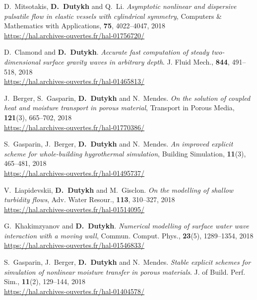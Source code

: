 \documentclass[final, a4paper, oneside, 12pt]{article}
\numberwithin{equation}{section}
\begin{document}
\begin{etaremune}
  \item D.~Mitsotakis, \textbf{D.~Dutykh} and Q.~Li. \textit{Asymptotic nonlinear and dispersive pulsatile flow in elastic vessels with cylindrical symmetry}, Computers \& Mathematics with Applications, \textbf{75}, 4022--4047, 2018 \\ %
  \url{https://hal.archives-ouvertes.fr/hal-01756720/}

  \item D.~Clamond and \textbf{D.~Dutykh}. \textit{Accurate fast computation of steady two-dimensional surface gravity waves in arbitrary depth}. J. Fluid Mech., \textbf{844}, 491--518, 2018 \\ %
  \url{https://hal.archives-ouvertes.fr/hal-01465813/}

  \item J.~Berger, S.~Gasparin, \textbf{D.~Dutykh} and N.~Mendes. \textit{On the solution of coupled heat and moisture transport in porous material}, Transport in Porous Media, \textbf{121}(3), 665--702, 2018 \\ %
  \url{https://hal.archives-ouvertes.fr/hal-01770386/}

  \item S.~Gasparin, J.~Berger, \textbf{D.~Dutykh} and N.~Mendes. \textit{An improved explicit scheme for whole-building hygrothermal simulation}, Building Simulation, \textbf{11}(3), 465--481, 2018 \\ %
  \url{https://hal.archives-ouvertes.fr/hal-01495737/}
  
  \item V.~Liapidevskii, \textbf{D.~Dutykh} and M.~Gisclon. \textit{On the modelling of shallow turbidity flows}, Adv. Water Resour., \textbf{113}, 310--327, 2018 \\ %
  \url{https://hal.archives-ouvertes.fr/hal-01514095/}

  \item G.~Khakimzyanov and \textbf{D.~Dutykh}. \textit{Numerical modelling of surface water wave interaction with a moving wall}, Commun. Comput. Phys., \textbf{23}(5), 1289--1354, 2018 \\ %
  \url{https://hal.archives-ouvertes.fr/hal-01546833/}

  \item S.~Gasparin, J.~Berger, \textbf{D.~Dutykh} and N.~Mendes. \textit{Stable explicit schemes for simulation of nonlinear moisture transfer in porous materials}. J. of Build. Perf. Sim., \textbf{11}(2), 129--144, 2018 \\ %
  \url{https://hal.archives-ouvertes.fr/hal-01404578/}


\end{etaremune}
\end{document}
